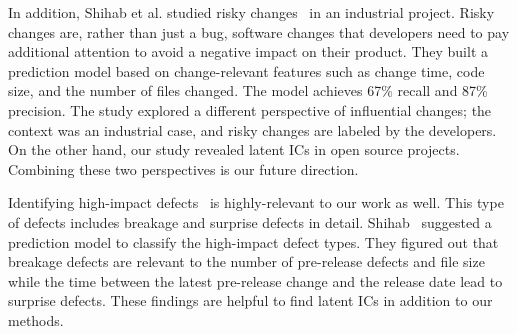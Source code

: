 
In addition, Shihab et al. studied risky changes~\cite{shihab_industrial_2012} in an industrial project. Risky changes are, rather than just a bug, software changes that developers need to pay additional attention to avoid a negative impact on their product. They built a prediction model based on change-relevant features such as change time, code size, and the number of files changed. The model achieves 67\% recall and 87\% precision. The study explored a different perspective of influential changes; the context was an industrial case, and risky changes are labeled by the developers. On the other hand, our study revealed latent ICs in open source projects. Combining these two perspectives is our future direction.

Identifying high-impact defects~\cite{shihab_high-impact_2011} is highly-relevant to our work as well. This type of defects includes breakage and surprise defects in detail. Shihab~\cite{shihab_high-impact_2011} suggested a prediction model to classify the high-impact defect types. They figured out that breakage defects are relevant to the number of pre-release defects and file size while the time between the latest pre-release change and the release date lead to surprise defects. These findings are helpful to find latent ICs in addition to our methods.



